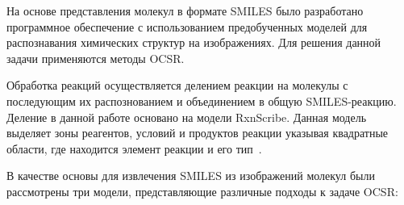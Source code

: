 На основе представления молекул в формате SMILES было разработано программное обеспечение с использованием предобученных моделей для распознавания химических структур на изображениях. Для решения данной задачи применяются методы OCSR. 

Обработка реакций осуществляется делением реакции на молекулы с последующим их распознованием и объединением в общую SMILES-реакцию. Деление в данной работе основано на модели RxnScribe. Данная модель выделяет зоны реагентов, условий и продуктов реакции указывая квадратные области, где находится элемент реакции и его тип~\cite{refLlava}.

В качестве основы для извлечения SMILES из изображений молекул были рассмотрены три модели, представляющие различные подходы к задаче OCSR:


